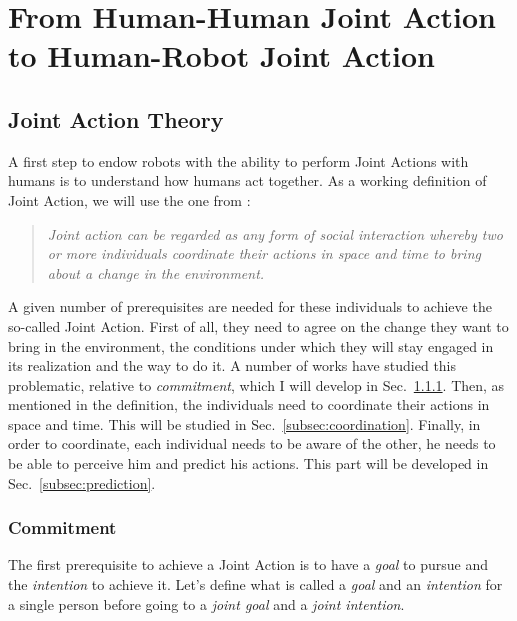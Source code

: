 \documentclass[english,a4paper,11pt,twoside]{StyleThese}
\begin{document}
\setcounter{chapter}{0} %
\dominitoc
\faketableofcontents
\fi

\chapter{From Human-Human Joint Action to Human-Robot Joint Action}
\minitoc

\label{ch:biblio}

\section{Joint Action Theory}

A first step to endow robots with the ability to perform Joint Actions with humans is to understand how humans act together. As a working definition of Joint Action, we will use the one from \cite{sebanz2006joint}:

\begin{quote}
\textit{Joint action can be regarded as any form of social interaction whereby two or more individuals coordinate their actions in space and time to bring about a change in the environment.}
\end{quote}

A given number of prerequisites are needed for these individuals to achieve the so-called Joint Action. First of all, they need to agree on the change they want to bring in the environment, the conditions under which they will stay engaged in its realization and the way to do it. A number of works have studied this problematic, relative to \textit{commitment}, which I will develop in Sec.~\ref{subsec:commitment}. Then, as mentioned in the definition, the individuals need to coordinate their actions in space and time. This will be studied in Sec.~\ref{subsec:coordination}. Finally, in order to coordinate, each individual needs to be aware of the other, he needs to be able to perceive him and predict his actions. This part will be developed in Sec.~\ref{subsec:prediction}.

\subsection{Commitment}

\label{subsec:commitment}

The first prerequisite to achieve a Joint Action is to have a \textit{goal} to pursue and the \textit{intention} to achieve it. Let's define what is called a \textit{goal} and an \textit{intention} for a single person before going to a \textit{joint goal} and a \textit{joint intention}.
\end{document}
